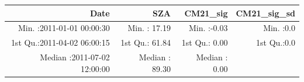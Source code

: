 \documentclass[
  10pt,
  a4paper,oneside]{article}
\begin{document}
\begin{longtable}[]{@{}rrrr@{}}
\toprule
\begin{minipage}[b]{0.34\columnwidth}\raggedleft
Date\strut
\end{minipage} & \begin{minipage}[b]{0.19\columnwidth}\raggedleft
SZA\strut
\end{minipage} & \begin{minipage}[b]{0.18\columnwidth}\raggedleft
CM21\_sig\strut
\end{minipage} & \begin{minipage}[b]{0.18\columnwidth}\raggedleft
CM21\_sig\_sd\strut
\end{minipage}\tabularnewline
\midrule
\endhead
\begin{minipage}[t]{0.34\columnwidth}\raggedleft
Min. :2011-01-01 00:00:30\strut
\end{minipage} & \begin{minipage}[t]{0.19\columnwidth}\raggedleft
Min. : 17.19\strut
\end{minipage} & \begin{minipage}[t]{0.18\columnwidth}\raggedleft
Min. :-0.03\strut
\end{minipage} & \begin{minipage}[t]{0.18\columnwidth}\raggedleft
Min. :0.0\strut
\end{minipage}\tabularnewline
\begin{minipage}[t]{0.34\columnwidth}\raggedleft
1st Qu.:2011-04-02 06:00:15\strut
\end{minipage} & \begin{minipage}[t]{0.19\columnwidth}\raggedleft
1st Qu.: 61.84\strut
\end{minipage} & \begin{minipage}[t]{0.18\columnwidth}\raggedleft
1st Qu.: 0.00\strut
\end{minipage} & \begin{minipage}[t]{0.18\columnwidth}\raggedleft
1st Qu.:0.0\strut
\end{minipage}\tabularnewline
\begin{minipage}[t]{0.34\columnwidth}\raggedleft
Median :2011-07-02 12:00:00\strut
\end{minipage} & \begin{minipage}[t]{0.19\columnwidth}\raggedleft
Median : 89.30\strut
\end{minipage} & \begin{minipage}[t]{0.18\columnwidth}\raggedleft
Median : 0.00\strut
\end{minipage} & \begin{minipage}[t]{0.18\columnwidth}\raggedleft

\end{minipage}
\end{longtable}
\end{document}
